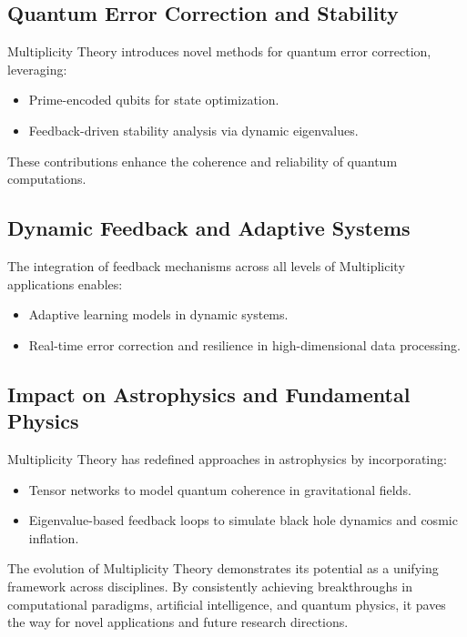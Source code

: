\documentclass{article}
\theoremstyle{plain}
\begin{document}
\subsection{Quantum Error Correction and Stability}
Multiplicity Theory introduces novel methods for quantum error correction, leveraging:
\begin{itemize}
    \item Prime-encoded qubits for state optimization.
    \item Feedback-driven stability analysis via dynamic eigenvalues.
\end{itemize}
These contributions enhance the coherence and reliability of quantum computations.

\subsection{Dynamic Feedback and Adaptive Systems}
The integration of feedback mechanisms across all levels of Multiplicity applications enables:
\begin{itemize}
    \item Adaptive learning models in dynamic systems.
    \item Real-time error correction and resilience in high-dimensional data processing.
\end{itemize}

\subsection{Impact on Astrophysics and Fundamental Physics}
Multiplicity Theory has redefined approaches in astrophysics by incorporating:
\begin{itemize}
    \item Tensor networks to model quantum coherence in gravitational fields.
    \item Eigenvalue-based feedback loops to simulate black hole dynamics and cosmic inflation.
\end{itemize}

The evolution of Multiplicity Theory demonstrates its potential as a unifying framework across disciplines. By consistently achieving breakthroughs in computational paradigms, artificial intelligence, and quantum physics, it paves the way for novel applications and future research directions.
\end{document}

